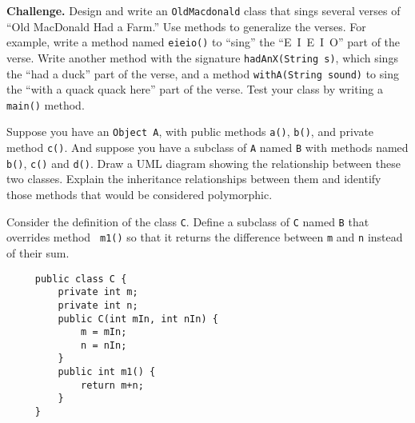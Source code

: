 \begin{EXRtwo}
\item  {\bf Challenge.} Design and write an {\tt OldMacdonald} class that
sings several verses of ``Old MacDonald Had a Farm.''  Use methods to
generalize the verses.  For example, write a method named {\tt eieio()}
to ``sing'' the \mbox{``E I E I O''} part of the verse.  Write another method
with the signature {\tt hadAnX(String s)}, which sings the ``had a
duck'' part of the verse, and a method {\tt withA(String sound)} to
sing the ``with a quack quack here'' part of the verse.   Test your
class by writing a {\tt main()} method.


\item Suppose you have an {\tt Object A}, with public methods
{\tt a()}, {\tt b()}, and private method {\tt c()}. And suppose
you have a subclass of {\tt A} named {\tt B} with methods named
{\tt b()}, {\tt c()} and {\tt d()}. Draw a UML diagram showing the
relationship between these two classes. Explain the inheritance
relationships between them and identify those methods that would
be considered polymorphic.

\item Consider the definition of the class {\tt C}.
Define a subclass of {\tt C} named {\tt B} that overrides method {\tt
m1()} so that it returns the difference between {\tt m} and {\tt n}
instead of their sum.
\begin{jjjlisting}
\begin{lstlisting}
     public class C {
         private int m;
         private int n;
         public C(int mIn, int nIn) {
             m = mIn;
             n = nIn;
         }
         public int m1() {
             return m+n;
         }
     }
\end{lstlisting}
\end{jjjlisting}

\end{EXRtwo}


%


